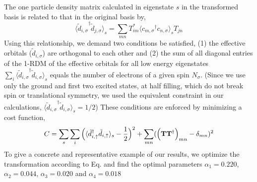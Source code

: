 The one particle density matrix calculated in eigenstate $s$ in the transformed basis is related to that in the original basis by,
\begin{equation}
	\langle {\tilde{d}_{i,\sigma}}^{\dagger} \tilde{d}_{j,\sigma} \rangle_{s} = \sum_{mn} T^{*}_{im} \langle {c_{m,\sigma}}^{\dagger} c_{n,\sigma} \rangle_{s} T_{jn}
\end{equation}
Using this relationship, we demand two conditions be satisfied, (1) the effective orbitals ($\tilde{d}_{i,\sigma}$) 
are orthogonal to each other and (2) the sum of all diagonal entries of the 1-RDM of the effective orbitals for all low energy eigenstates 
$\sum_{i} \langle {\tilde{d}_{i,\sigma}}^{\dagger} \tilde{d}_{i,\sigma} \rangle_{s}$ 
equals the number of electrons of a given spin $N_{\sigma}$. 
(Since we use only the ground and first two excited states, at half filling, which do not break spin or translational symmetry, 
we used the equivalent constraint in our calculations, $\langle {\tilde{d}_{i,\sigma}}^{\dagger} \tilde{d}_{i,\sigma} \rangle_{s} =1/2 $) 
These conditions are enforced by minimizing a cost function,
\begin{equation}
C = \sum_{s} \sum_{i} \Big( \langle \tilde{d}_{i,\uparrow}^{\dagger} \tilde{d}_{i,\uparrow} \rangle_{s} - \frac{1}{2} \Big)^{2} + \sum_{mn} ( \Big({\bf T} {\bf T}^{\dagger}\Big)_{mn} -\delta_{mn})^{2}
\label{eq:C}
\end{equation} 
To give a concrete and representative example of our results, we optimize the transformation 
according to Eq. and find the optimal parameters $\alpha_1=0.220$, $\alpha_2=0.044$, $\alpha_3=0.020$ 
and $\alpha_4=0.018$ 
